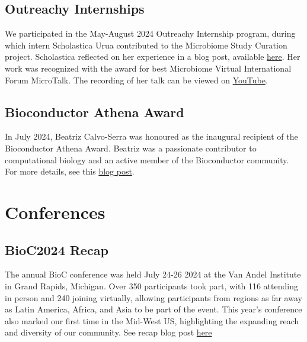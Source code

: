 \hypertarget{outreachy-internships}{%
\subsection{Outreachy Internships}\label{outreachy-internships}}

We participated in the May-August 2024 Outreachy Internship program, during which intern Scholastica Urua contributed to the Microbiome Study Curation project. Scholastica reflected on her experience in a blog post, available \href{https://blog.bioconductor.org/posts/2024-08-15-OutreachyInternshipExperience/}{here}. Her work was recognized with the award for best Microbiome Virtual International Forum MicroTalk. The recording of her talk can be viewed on \href{https://www.youtube.com/watch?v=tGwTAxmvEYc&list=PLLOHGJKpTq6pG03Az_I80ZUReMYVmwqB9&index=5}{YouTube}.

\hypertarget{bioconductor-athena-award}{%
\subsection{Bioconductor Athena Award}\label{bioconductor-athena-award}}

In July 2024, Beatriz Calvo-Serra was honoured as the inaugural recipient of the Bioconductor Athena Award. Beatriz was a passionate contributor to computational biology and an active member of the Bioconductor community. For more details, see this \href{https://blog.bioconductor.org/posts/2024-07-29-athena-award/}{blog post}.

\hypertarget{conferences}{%
\section{Conferences}\label{conferences}}

\hypertarget{bioc2024-recap}{%
\subsection{BioC2024 Recap}\label{bioc2024-recap}}

The annual BioC conference was held July 24-26 2024 at the Van Andel Institute in Grand Rapids, Michigan. Over 350 participants took part, with 116 attending in person and 240 joining virtually, allowing participants from regions as far away as Latin America, Africa, and Asia to be part of the event. This year's conference also marked our first time in the Mid-West US, highlighting the expanding reach and diversity of our community. See recap blog post \href{https://blog.bioconductor.org/posts/2024-08-12-bioc2024-recap/}{here}

